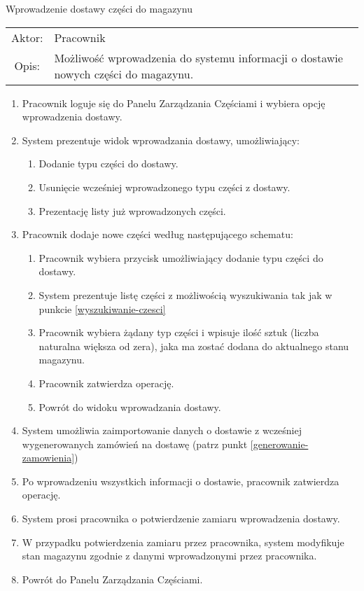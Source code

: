   \item Wprowadzenie dostawy części do magazynu \\
  \begin{tabularx}{\linewidth}{ c X }
  Aktor: & Pracownik \\
  Opis: & Możliwość wprowadzenia do systemu informacji o dostawie nowych części do magazynu.\\
  \end{tabularx}
   \begin{enumerate}
    \item Pracownik loguje się do Panelu Zarządzania Częściami i wybiera opcję wprowadzenia dostawy.
    \item System prezentuje widok wprowadzania dostawy, umożliwiający:
    \begin{enumerate}
      \item Dodanie typu części do dostawy.
      \item Usunięcie wcześniej wprowadzonego typu części z dostawy.
      \item Prezentację listy już wprowadzonych części.
    \end{enumerate}
    \item Pracownik dodaje nowe części według następującego schematu:
    \begin{enumerate}
      \item Pracownik wybiera przycisk umożliwiający dodanie typu części do dostawy.
      \item System prezentuje listę części z możliwością wyszukiwania tak jak w punkcie \ref{wyszukiwanie-czesci}
      \item Pracownik wybiera żądany typ części i wpisuje ilość sztuk (liczba naturalna większa od zera), jaka ma zostać dodana do aktualnego stanu magazynu.
      \item Pracownik zatwierdza operację.
      \item Powrót do widoku wprowadzania dostawy.
    \end{enumerate}
    \item System umożliwia zaimportowanie danych o dostawie z wcześniej wygenerowanych zamówień na dostawę (patrz punkt \ref{generowanie-zamowienia})
    \item Po wprowadzeniu wszystkich informacji o dostawie, pracownik zatwierdza operację.
    \item System prosi pracownika o potwierdzenie zamiaru wprowadzenia dostawy.
    \item W przypadku potwierdzenia zamiaru przez pracownika, system modyfikuje stan magazynu zgodnie z danymi wprowadzonymi przez pracownika.
    \item Powrót do Panelu Zarządzania Częściami.
  \end{enumerate}
  
